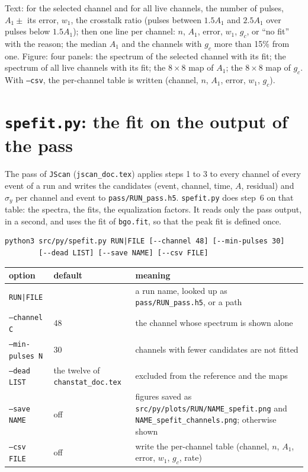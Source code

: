 \documentclass[11pt]{article}
\newcommand{\code}[1]{\texttt{#1}}
\begin{document}
Text: for the selected channel and for all live channels, the number of
pulses, $A_1 \pm$ its error, $w_1$, the crosstalk ratio (pulses between
$1.5 A_1$ and $2.5 A_1$ over pulses below $1.5 A_1$); then one line per
channel: $n$, $A_1$, error, $w_1$, $g_c$, or ``no fit'' with the reason;
the median $A_1$ and the channels with $g_c$ more than 15\% from one.
Figure: four panels: the spectrum of the selected channel with its fit;
the spectrum of all live channels with its fit; the $8\times8$ map of
$A_1$; the $8\times8$ map of $g_c$. With \code{--csv}, the per-channel
table is written (channel, $n$, $A_1$, error, $w_1$, $g_c$).

\section{\code{spefit.py}: the fit on the output of the pass}

The pass of \code{JScan} (\code{jscan\_doc.tex}) applies steps 1 to 3 to
every channel of every event of a run and writes the candidates (event,
channel, time, $A$, residual) and $\sigma_y$ per channel and event to
\code{pass/RUN\_pass.h5}. \code{spefit.py} does step~6 on that table: the
spectra, the fits, the equalization factors. It reads only the pass
output, in a second, and uses the fit of \code{bgo.fit}, so that the peak
fit is defined once.

\begin{lstlisting}
python3 src/py/spefit.py RUN|FILE [--channel 48] [--min-pulses 30]
        [--dead LIST] [--save NAME] [--csv FILE]
\end{lstlisting}

\begin{center}
\begin{tabular}{l l p{76mm}}
\toprule
option & default & meaning \\
\midrule
\code{RUN|FILE} & & a run name, looked up as \code{pass/RUN\_pass.h5}, or a path \\
\code{--channel C} & 48 & the channel whose spectrum is shown alone \\
\code{--min-pulses N} & 30 & channels with fewer candidates are not fitted \\
\code{--dead LIST} & the twelve of \code{chanstat\_doc.tex} & excluded from the reference and the maps \\
\code{--save NAME} & off & figures saved as \code{src/py/plots/RUN/NAME\_spefit.png} and \code{NAME\_spefit\_channels.png}; otherwise shown \\
\code{--csv FILE} & off & write the per-channel table (channel, $n$, $A_1$, error, $w_1$, $g_c$, rate) \\
\bottomrule
\end{tabular}
\end{center}
\end{document}
